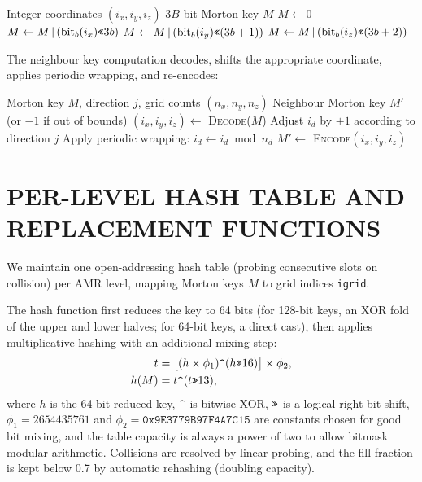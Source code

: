 \documentclass[fleqn,usenatbib]{mnras}
\newcommand{\code}[1]{\texttt{#1}}
\begin{document}
\begin{algorithm}[H]
\caption{Morton key encoding of $(i_x, i_y, i_z)$}
\label{alg:morton_encode}
\begin{algorithmic}[1]
\REQUIRE Integer coordinates $(i_x, i_y, i_z)$
\ENSURE $3B$-bit Morton key $M$
\STATE $M \leftarrow 0$
  \STATE $M \leftarrow M \,|\, (\text{bit}_b(i_x) \text{\texttt{<<}} 3b)$
  \STATE $M \leftarrow M \,|\, (\text{bit}_b(i_y) \text{\texttt{<<}} (3b+1))$
  \STATE $M \leftarrow M \,|\, (\text{bit}_b(i_z) \text{\texttt{<<}} (3b+2))$
\ENDFOR
\end{algorithmic}
\end{algorithm}

The neighbour key computation decodes, shifts the appropriate
coordinate, applies periodic wrapping, and re-encodes:

\begin{algorithm}[H]
\caption{Morton neighbour key in direction $j$}
\label{alg:morton_neighbor}
\begin{algorithmic}[1]
\REQUIRE Morton key $M$, direction $j$, grid counts $(n_x, n_y, n_z)$
\ENSURE Neighbour Morton key $M'$ (or $-1$ if out of bounds)
\STATE $(i_x, i_y, i_z) \leftarrow$ \textsc{Decode}($M$)
\STATE Adjust $i_d$ by $\pm 1$ according to direction $j$
\STATE Apply periodic wrapping: $i_d \leftarrow i_d \bmod n_d$
\STATE $M' \leftarrow$ \textsc{Encode}$(i_x, i_y, i_z)$
\end{algorithmic}
\end{algorithm}


\section{PER-LEVEL HASH TABLE AND REPLACEMENT FUNCTIONS}
\label{app:hashtable}

We maintain one open-addressing hash table (probing consecutive slots
on collision) per AMR level, mapping Morton keys $M$ to grid indices
\code{igrid}.

The hash function first reduces the key to 64 bits (for
128-bit keys, an XOR fold of the upper and lower halves; for 64-bit
keys, a direct cast), then applies multiplicative hashing
with an additional mixing step:
\begin{align}
t   &= \bigl[(h \times \phi_1) \text{\texttt{\textasciicircum}} (h \text{\texttt{>>}} 16)\bigr] \times \phi_2,
\nonumber \\
h(M) &= t \text{\texttt{\textasciicircum}} (t \text{\texttt{>>}} 13),
\label{eq:hash_func}
\end{align}
where $h$ is the 64-bit reduced key,
$\text{\texttt{\textasciicircum}}$ is bitwise XOR,
$\text{\texttt{>>}}$ is a logical right bit-shift,
$\phi_1 = 2654435761$ and $\phi_2 = \texttt{0x9E3779B97F4A7C15}$
are constants chosen for good bit mixing, and the table capacity is
always a power of two to allow bitmask modular arithmetic. Collisions
are resolved by linear probing, and the fill fraction is kept below 0.7 by
automatic rehashing (doubling capacity).
\end{document}
